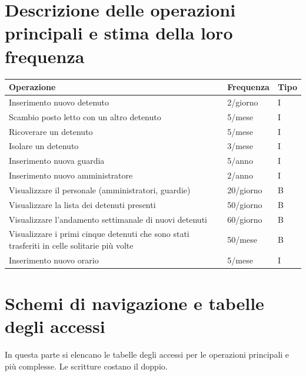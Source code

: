 \documentclass[a4paper,12pt]{report}
\begin{document}
\section{Descrizione delle operazioni principali e stima della loro frequenza}
\begin{table}[H]
\begin{tabular}{p{9cm} p{2cm} p{1cm}}
\hline
Operazione & Frequenza & Tipo \\ \hline
Inserimento nuovo detenuto & 2/giorno & I \\
Scambio posto letto con un altro detenuto & 5/mese & I \\
Ricoverare un detenuto & 5/mese & I \\
Isolare un detenuto & 3/mese & I \\
Inserimento nuova guardia & 5/anno & I \\
Inserimento nuovo amministratore & 2/anno & I \\
Visualizzare il personale (amministratori, guardie) & 20/giorno & B\\
Visualizzare la lista dei detenuti presenti & 50/giorno & B\\
Visualizzare l'andamento settimanale di nuovi detenuti & 60/giorno & B \\
Visualizzare i primi cinque detenuti che sono stati trasferiti in celle solitarie più volte & 50/mese & B \\
Inserimento nuovo orario & 5/mese & I 
\end{tabular}
\end{table}
\section{Schemi di navigazione e tabelle degli accessi}
In questa parte si elencano le tabelle degli accessi per le operazioni principali e più complesse.
%
Le scritture costano il doppio.
\end{document}
